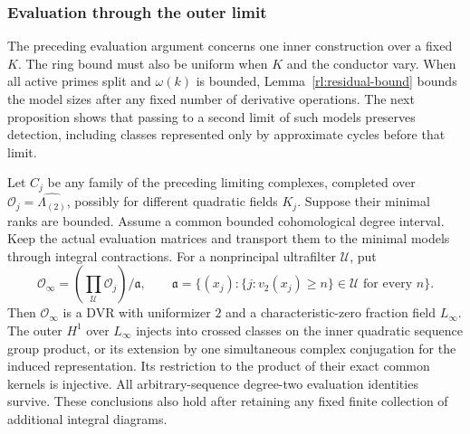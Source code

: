 \subsubsection{Evaluation through the outer limit}

The preceding evaluation argument concerns one inner construction over a
fixed $K$. The ring bound must also be uniform when $K$ and the conductor
vary. When all active primes split and $\omega(k)$ is bounded,
Lemma~\ref{rl:residual-bound} bounds the model sizes after any fixed
number of derivative operations. The next proposition shows that passing to a second
limit of such models preserves detection, including classes represented
only by approximate cycles before that limit.

\begin{proposition}
\label{rl:outer-evaluation}
Let $C_j$ be any family of the preceding limiting complexes, completed
over $\mathcal O_j=\widehat{\Lambda_{(2)}}$, possibly for different
quadratic fields $K_j$.  Suppose their minimal ranks are bounded.
Assume a common bounded cohomological degree interval. Keep the
actual evaluation matrices and transport them to the minimal models
through integral contractions.  For a nonprincipal
ultrafilter $\mathcal U$, put
\[
 \mathcal O_\infty=
 \left(\prod_{\mathcal U}\mathcal O_j\right)/\mathfrak a,
 \qquad
 \mathfrak a=\{(x_j):
    \{j:v_2(x_j)\geq n\}\in\mathcal U\text{ for every }n\}.
\]
Then $\mathcal O_\infty$ is a DVR with uniformizer $2$ and a
characteristic-zero fraction field $L_\infty$. The outer $H^1$ over
$L_\infty$ injects into crossed classes on the inner quadratic sequence
group product, or its extension by one simultaneous complex conjugation
for the induced representation.  Its restriction to the product
of their exact common kernels is injective.  All arbitrary-sequence
degree-two evaluation identities survive.  These conclusions also
hold after retaining any fixed finite collection of additional
integral diagrams.
\end{proposition}

